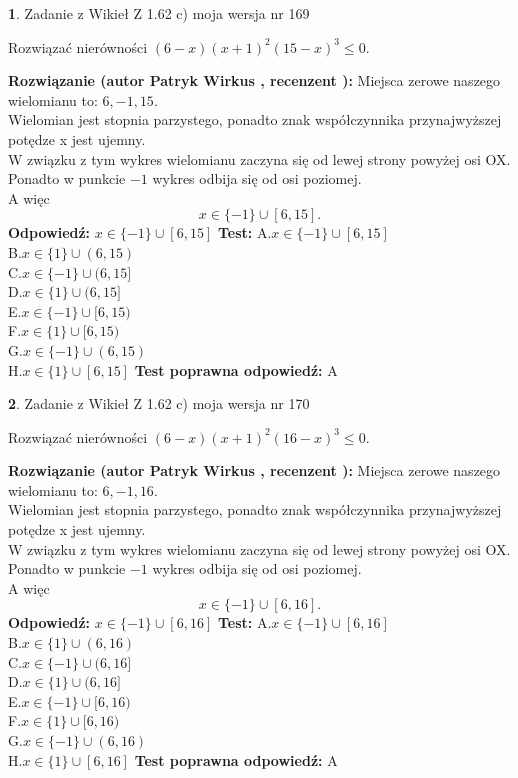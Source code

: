 \documentclass[12pt, a4paper]{article}
\theoremstyle{definition} %
\newtheorem{zad}{}
\newcommand{\zadStart}[1]{\begin{zad}#1\newline}
\newcommand{\zadStop}{\end{zad}}
\newcommand{\rozwStart}[2]{\noindent \textbf{Rozwiązanie (autor #1 , recenzent #2): }\newline}
\newcommand{\rozwStop}{\newline}
\newcommand{\odpStart}{\noindent \textbf{Odpowiedź:}\newline}
\newcommand{\odpStop}{\newline}
\newcommand{\testStart}{\noindent \textbf{Test:}\newline}
\newcommand{\testStop}{\newline}
\newcommand{\kluczStart}{\noindent \textbf{Test poprawna odpowiedź:}\newline}
\newcommand{\kluczStop}{\newline}
\begin{document}
\zadStart{Zadanie z Wikieł Z 1.62 c) moja wersja nr 169}

Rozwiązać nierówności $(6-x)(x+1)^{2}(15-x)^{3}\le0$.
\zadStop
\rozwStart{Patryk Wirkus}{}
Miejsca zerowe naszego wielomianu to: $6, -1, 15$.\\
Wielomian jest stopnia parzystego, ponadto znak współczynnika przy\linebreak najwyższej potędze x jest ujemny.\\ W związku z tym wykres wielomianu zaczyna się od lewej strony powyżej osi OX.\\
Ponadto w punkcie $-1$ wykres odbija się od osi poziomej.\\
A więc $$x \in \{-1\} \cup [6,15].$$
\rozwStop
\odpStart
$x \in \{-1\} \cup [6,15]$
\odpStop
\testStart
A.$x \in \{-1\} \cup [6,15]$\\
B.$x \in \{1\} \cup (6,15)$\\
C.$x \in \{-1\} \cup (6,15]$\\
D.$x \in \{1\} \cup (6,15]$\\
E.$x \in \{-1\} \cup [6,15)$\\
F.$x \in \{1\} \cup [6,15)$\\
G.$x \in \{-1\} \cup (6,15)$\\
H.$x \in \{1\} \cup [6,15]$
\testStop
\kluczStart
A
\kluczStop



\zadStart{Zadanie z Wikieł Z 1.62 c) moja wersja nr 170}

Rozwiązać nierówności $(6-x)(x+1)^{2}(16-x)^{3}\le0$.
\zadStop
\rozwStart{Patryk Wirkus}{}
Miejsca zerowe naszego wielomianu to: $6, -1, 16$.\\
Wielomian jest stopnia parzystego, ponadto znak współczynnika przy\linebreak najwyższej potędze x jest ujemny.\\ W związku z tym wykres wielomianu zaczyna się od lewej strony powyżej osi OX.\\
Ponadto w punkcie $-1$ wykres odbija się od osi poziomej.\\
A więc $$x \in \{-1\} \cup [6,16].$$
\rozwStop
\odpStart
$x \in \{-1\} \cup [6,16]$
\odpStop
\testStart
A.$x \in \{-1\} \cup [6,16]$\\
B.$x \in \{1\} \cup (6,16)$\\
C.$x \in \{-1\} \cup (6,16]$\\
D.$x \in \{1\} \cup (6,16]$\\
E.$x \in \{-1\} \cup [6,16)$\\
F.$x \in \{1\} \cup [6,16)$\\
G.$x \in \{-1\} \cup (6,16)$\\
H.$x \in \{1\} \cup [6,16]$
\testStop
\kluczStart
A
\kluczStop
\end{document}
